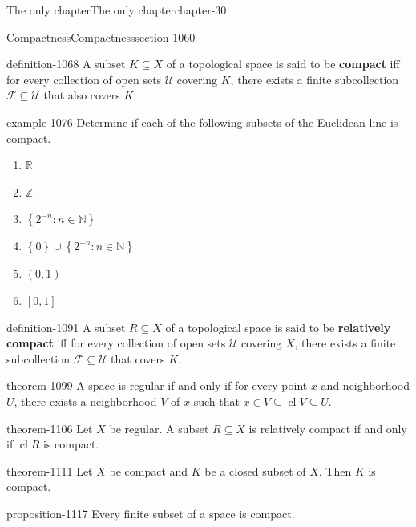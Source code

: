 \documentclass[oneside,10pt,]{book}
\newcommand{\terminology}[1]{\textbf{#1}}
\newcommand{\mb}{\mathbb}
\newcommand{\mc}{\mathcal}
\newcommand{\cl}{\operatorname{cl}}
\newcommand{\setBuilder}[2]{\left\{#1:#2\right\}}
\newcommand{\setList}[1]{\left\{#1\right\}}
\begin{document}
\begin{chapterptx}{The only chapter}{}{The only chapter}{}{}{chapter-30}
\begin{sectionptx}{Compactness}{}{Compactness}{}{}{section-1060}
\begin{definition}{}{definition-1068}
\hypertarget{p-1069}{}%
A subset \(K\subseteq X\) of a topological space is said to be \terminology{compact} iff for every collection of open sets \(\mc U\) covering \(K\), there exists a finite subcollection \(\mc F\subseteq\mc U\) that also covers \(K\).%
\end{definition}
\begin{example}{}{example-1076}%
\hypertarget{p-1077}{}%
Determine if each of the following subsets of the Euclidean line is compact.%
\leavevmode%
\begin{enumerate}
\item\hypertarget{li-1079}{}\(\mb R\)%
\item\hypertarget{li-1081}{}\(\mb Z\)%
\item\hypertarget{li-1083}{}\(\setBuilder{2^{-n}}{n\in\mb N}\)%
\item\hypertarget{li-1085}{}\(\setList{0}\cup\setBuilder{2^{-n}}{n\in\mb N}\)%
\item\hypertarget{li-1087}{}\((0,1)\)%
\item\hypertarget{li-1089}{}\([0,1]\)%
\end{enumerate}
\end{example}
\begin{definition}{}{definition-1091}%
\hypertarget{p-1092}{}%
A subset \(R\subseteq X\) of a topological space is said to be \terminology{relatively compact} iff for every collection of open sets \(\mc U\) covering \(X\), there exists a finite subcollection \(\mc F\subseteq\mc U\) that covers \(K\).%
\end{definition}
\begin{theorem}{}{}{theorem-1099}%
\hypertarget{p-1100}{}%
A space is regular if and only if for every point \(x\) and neighborhood \(U\), there exists a neighborhood \(V\) of \(x\) such that \(x\in V\subseteq\cl V\subseteq U\).%
\end{theorem}
\begin{theorem}{}{}{theorem-1106}%
\hypertarget{p-1107}{}%
Let \(X\) be regular. A subset \(R\subseteq X\) is relatively compact if and only if \(\cl R\) is compact.%
\end{theorem}
\begin{theorem}{}{}{theorem-1111}%
\hypertarget{p-1112}{}%
Let \(X\) be compact and \(K\) be a closed subset of \(X\). Then \(K\) is compact.%
\end{theorem}
\begin{proposition}{}{}{proposition-1117}%
\hypertarget{p-1118}{}%
Every finite subset of a space is compact.%
\end{proposition}

\end{sectionptx}
\end{chapterptx}
\end{document}
